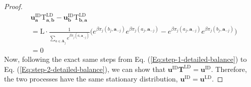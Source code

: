 \documentclass[11pt]{article}
\theoremstyle{plainCl1}
\theoremstyle{plainCl2}
\newcommand{\A}{\mathbf{A}}
\newcommand{\abf}{\mathbf{a}}
\newcommand{\bbf}{\mathbf{b}}
\newcommand{\T}{\mathbf{T}}
\newcommand{\ubf}{\mathbf{u}}
\newcommand{\LD}{\mathrm{LD}}
\newcommand{\ID}{\mathrm{ID}}
\begin{document}
\begin{proof}
\begin{align}
&\ubf^\ID_\abf \mathrm{T}^\LD_{\abf,\bbf} - \ubf^\ID_\bbf \mathrm{T}^\LD_{\bbf,\abf} \\[15pt]
&= \mathrm{L} \cdot \frac{1}{\displaystyle \sum_{a \in \A_j} e^{\beta \pi_j(a,\abf_{-j})}} \bigg( e^{\beta \pi_j(b_j, \abf_{-j})} e^{\beta \pi_j(a_j, \abf_{-j})}  - e^{\beta \pi_j(a_j, \abf_{-j})} e^{\beta \pi_j(b_j, \abf_{-j})} \bigg) \\[10pt]
&= 0
\end{align}
\noindent Now, following the exact same steps from Eq. (\ref{Eq:step-1-detailed-balance}) to Eq. (\ref{Eq:step-2-detailed-balance}), we can show that $\ubf^\ID \T^\LD = \ubf^\ID$. Therefore, the two processes have the same stationary distribution, $\ubf^\ID = \ubf^\LD$.
\end{proof}

\newpage
\end{document}
